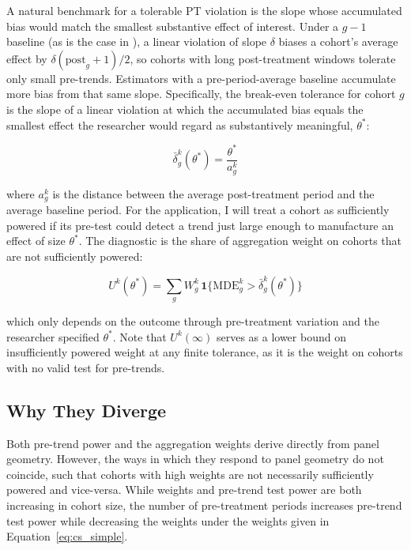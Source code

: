 \documentclass[12pt]{article}
\begin{document}
A natural benchmark for a tolerable PT violation is the slope whose accumulated bias would match the smallest substantive effect of interest. Under a $g-1$ baseline (as is the case in \textcite{callaway2021difference}), a linear violation of slope $\delta$ biases a cohort's average effect by $\delta (\text{post}_g + 1)/2$, so cohorts with long post-treatment windows tolerate only small pre-trends. Estimators with a pre-period-average baseline accumulate more bias from that same slope. Specifically, the break-even tolerance for cohort $g$ is the slope of a linear violation at which the accumulated bias equals the smallest effect the researcher would regard as substantively meaningful, $\theta^*$:

\begin{equation}\label{eq:breakeven}
    \bar{\delta}^k_g(\theta^*) = \frac{\theta^*}{a_g^k}
\end{equation}

where $a^k_g$ is the distance between the average
post-treatment period and the average baseline period. For the application, I will treat a cohort as sufficiently powered if its pre-test could detect a trend just large enough to manufacture an effect of size $\theta^*$. The diagnostic is the share of aggregation weight on cohorts that are not sufficiently powered:

\begin{equation}\label{eq:underpowerd}
    U^k(\theta^*) = \sum_g W^k_g \,
    \mathbf{1}\{\text{MDE}^k_g > \bar{\delta}^k_g(\theta^*)\}
\end{equation}

which only depends on the outcome through pre-treatment variation and the researcher specified $\theta^*$. Note that $U^k(\infty)$ serves as a lower bound on insufficiently powered weight at any finite tolerance, as it is the weight on cohorts with no valid test for pre-trends.

\subsection{Why They Diverge}\label{sec:diverge}   %

Both pre-trend power and the aggregation weights derive directly from panel geometry. However, the ways in which they respond to panel geometry do not coincide, such that cohorts with high weights are not necessarily sufficiently powered and vice-versa. While weights and pre-trend test power are both increasing in cohort size, the number of pre-treatment periods increases pre-trend test power while decreasing the weights under the weights given in Equation~\ref{eq:cs_simple}.
\end{document}
